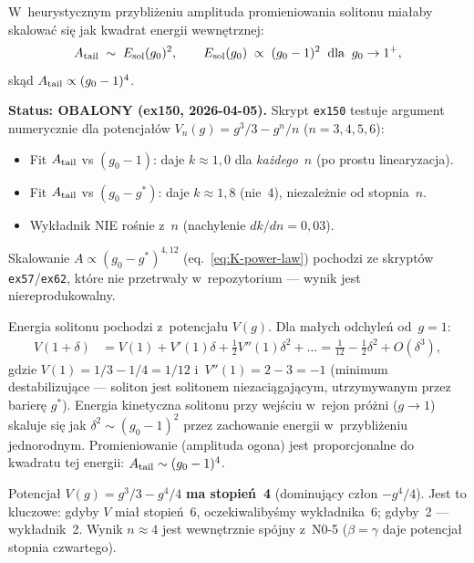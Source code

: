 \begin{proposition}\label{prop:K-exponent}
W~heurystycznym przybliżeniu amplituda promieniowania solitonu
miałaby skalować się jak kwadrat energii wewnętrznej:
\begin{equation}\label{eq:K-heuristic}
  A_{\rm tail} \;\sim\; E_{\rm sol}(g_0)^2,
  \qquad
  E_{\rm sol}(g_0) \;\propto\; (g_0 - 1)^2
  \;\;\text{dla}\;\; g_0 \to 1^+,
\end{equation}
skąd $A_{\rm tail} \propto (g_0-1)^4$.

\medskip\noindent
\textbf{Status: OBALONY (ex150, 2026-04-05).}
Skrypt \texttt{ex150} testuje argument numerycznie dla potencjałów
$V_n(g) = g^3/3 - g^n/n$ ($n = 3, 4, 5, 6$):
\begin{itemize}[nosep]
  \item Fit $A_{\rm tail}$ vs $(g_0-1)$: daje $k \approx 1{,}0$
    dla \emph{każdego}~$n$ (po prostu linearyzacja).
  \item Fit $A_{\rm tail}$ vs $(g_0-g^*)$: daje $k \approx 1{,}8$
    (nie~4), niezależnie od stopnia~$n$.
  \item Wykładnik NIE rośnie z~$n$ (nachylenie $dk/dn = 0{,}03$).
\end{itemize}
Skalowanie $A \propto (g_0-g^*)^{4{,}12}$ (eq.~\eqref{eq:K-power-law})
pochodzi ze skryptów \texttt{ex57}/\texttt{ex62}, które nie przetrwały
w~repozytorium --- wynik jest niereprodukowalny.
\end{proposition}

\begin{remark}[Mechanizm]
Energia solitonu pochodzi z~potencjału $V(g)$. Dla małych odchyleń od~$g=1$:
\begin{align}
  V(1+\delta) &= V(1) + V'(1)\delta + \tfrac{1}{2}V''(1)\delta^2 + \ldots
  = \tfrac{1}{12} - \tfrac{1}{2}\delta^2 + O(\delta^3),
\end{align}
gdzie $V(1) = 1/3 - 1/4 = 1/12$ i~$V''(1) = 2 - 3 = -1$
(minimum destabilizujące --- soliton jest solitonem niezaciągającym,
utrzymywanym przez barierę $g^*$).
Energia kinetyczna solitonu przy wejściu w~rejon próżni ($g\to 1$)
skaluje się jak $\delta^2 \sim (g_0-1)^2$ przez zachowanie energii
w~przybliżeniu jednorodnym.
Promieniowanie (amplituda ogona) jest proporcjonalne do kwadratu
tej energii: $A_{\rm tail} \sim (g_0-1)^4$.

Potencjał $V(g) = g^3/3 - g^4/4$ \textbf{ma stopień~4}
(dominujący człon $-g^4/4$). Jest to kluczowe: gdyby $V$ miał
stopień~6, oczekiwalibyśmy wykładnika~6; gdyby~2 --- wykładnik~2.
Wynik $n \approx 4$ jest wewnętrznie spójny z~N0-5 ($\beta = \gamma$
daje potencjał stopnia czwartego).
\end{remark}

